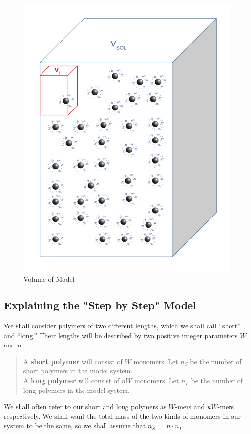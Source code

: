 \documentclass[journal=mamobx,manuscript=article]{achemso}
\begin{document}
\begin{figure}[H] 
\includegraphics[scale=0.5]{fig7.jpg}
\caption{Volume of Model}
\label{figure 1}
\end{figure}

\subsection{Explaining the "Step by Step" Model}

We shall consider polymers of two different lengths, which we shall call ``short'' and ``long.''  Their lengths
will be described by two positive integer parameters $W$ and $n$.

\begin{verse}
A \textbf{short polymer} will consist of $W$ monomers.  
Let $n_S$ be the number of short polymers in the model system. 
\\
A \textbf{long polymer} will consist of $nW$ monomers.  
Let $n_L$ be the number of long polymers in the model system. 
\end{verse}
We shall often refer to our short and long polymers as $W$-mers and $nW$-mers respectively.
We shall want the total mass of the two kinds of monomers in our system to be the same, so we 
shall assume that $n_S \,=\, n\cdot n_L$.
\end{document}
